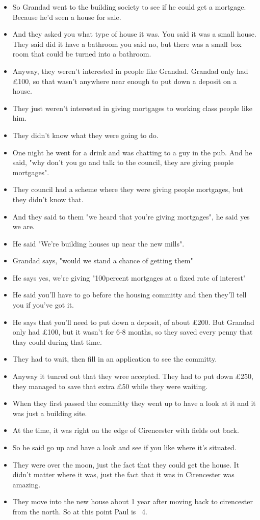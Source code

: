 \documentclass[10pt,twocolumn,letterpaper]{article}
\begin{document}
\begin{itemize}
    \item So Grandad went to the building society to see if he could get a mortgage. Because he'd seen a house for sale.
    \item And they asked you what type of house it was. You said it was a small house. They said did it have a bathroom you said no, but there was a small box room that could be turned into a bathroom.
    \item Anyway, they weren't interested in people like Grandad. Grandad only had £100, so that wasn't anywhere near enough to put down a deposit on a house.
    \item They just weren't interested in giving mortgages to working class people like him.
    \item They didn't know what they were going to do.
    \item One night he went for a drink and was chatting to a guy in the pub. And he said, "why don't you go and talk to the council, they are giving people mortgages".
    \item They council had a scheme where they were giving people mortgages, but they didn't know that.
    \item And they said to them "we heard that you're giving mortgages", he said yes we are.
    \item He said "We're building houses up near the new mills".
    \item Grandad says, "would we stand a chance of getting them"
    \item He says yes, we're giving "100percent mortgages at a fixed rate of interest"
    \item He said you'll have to go before the housing committy and then they'll tell you if you've got it.
    \item He says that you'll need to put down a deposit, of about £200. But Grandad only had £100, but it wasn't for 6-8 months, so they saved every penny that thay could during that time.
    \item They had to wait, then fill in an application to see the committy.
    \item Anyway it tunred out that they wree accepted. They had to put down £250, they managed to save that extra £50 while they were waiting.
    \item When they first passed the committy they went up to have a look at it and it was just a building site.
    \item At the time, it was right on the edge of Cirencester with fields out back.
    \item So he said go up and have a look and see if you like where it's situated.
    \item They were over the moon, just the fact that they could get the house. It didn't matter where it was, just the fact that it was in Cirencester was amazing.
    \item They move into the new house about 1 year after moving back to cirencester from the north. So at this point Paul is ~4.
\end{itemize}
\end{document}
